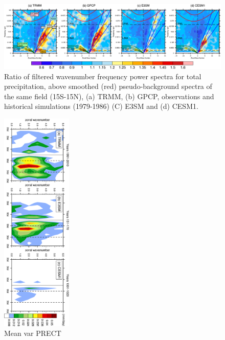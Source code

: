 \documentclass[draft,ms]{AGUTeX}
\begin{document}
\begin{article}
\begin{figure}[t]
  \begin{center}
    \noindent\includegraphics[width=1.1\textwidth,angle=0.]{./figs/f_kf_sym_ratio_PRECT.pdf}
  \end{center}
  \caption{Ratio of filtered wavenumber frequency power spectra for total precipitation, above smoothed (red) pseudo-background spectra of the same field (15\deg S-15\deg N),   (a) TRMM, (b) GPCP, observations and historical simulations (1979-1986) (C) E3SM  and (d) CESM1.} 
\label{f_kf_sym_ratio_PRECT}
\end{figure}


\begin{figure}[t]
  \begin{center}
    \noindent\includegraphics[width=0.3\textwidth,angle=90.]{./figs/f_mjo_spectra_PRECT_djf.pdf}
  \end{center}
  \caption{Mean var PRECT } 
\label{f_mjo_spectra_PRECT_djf}
\end{figure}


\end{article}
\end{document}
